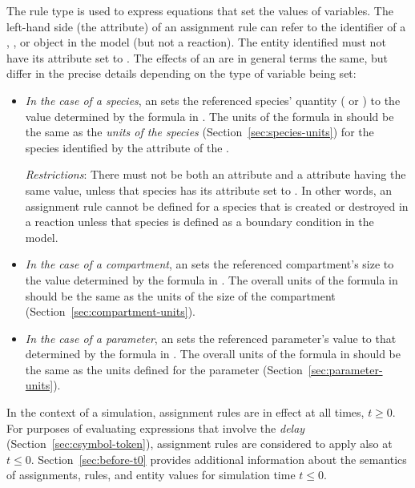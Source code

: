 The rule type \AssignmentRule is used to express equations that
set the values of variables.  The left-hand side (the
 attribute) of an assignment rule can refer to the
identifier of a \Species, \Compartment, or \Parameter object in
the model (but not a reaction).  The entity identified must not
have its  attribute set to .  The effects of
an \AssignmentRule are in general terms the same, but differ in
the precise details depending on the type of variable being set:

\begin{itemize}
  
\item \emph{In the case of a species}, an \AssignmentRule sets the
  referenced species' quantity ( or
  ) to the value determined by the
  formula in .  The units of the formula in
   should be the same as the \emph{units of the species}
  (Section~\ref{sec:species-units}) for the species identified by
  the  attribute of the \AssignmentRule.
  
  \emph{Restrictions}: There must not be both an \AssignmentRule
   attribute and a \SpeciesReference {}
  attribute having the same value, unless that species has its
   attribute set to .  In other
  words, an assignment rule cannot be defined for a species that
  is created or destroyed in a reaction unless that species is
  defined as a boundary condition in the model.

\item \emph{In the case of a compartment}, an \AssignmentRule sets
  the referenced compartment's size to the value determined by the
  formula in .  The overall units of the formula in
   should be the same as the units of the size of the
  compartment (Section~\ref{sec:compartment-units}).
  
\item \emph{In the case of a parameter}, an \AssignmentRule sets
  the referenced parameter's value to that determined by the
  formula in .  The overall units of the formula in
   should be the same as the units defined for the
  parameter (Section~\ref{sec:parameter-units}).

\end{itemize}

In the context of a simulation, assignment rules are in effect at
all times, $t \geq 0$.  For purposes of evaluating expressions
that involve the \emph{delay} 
(Section~\ref{sec:csymbol-token}), assignment rules are considered
to apply also at $t \leq 0$.  Section~\ref{sec:before-t0} provides
additional information about the semantics of assignments, rules,
and entity values for simulation time $t \leq 0$.

